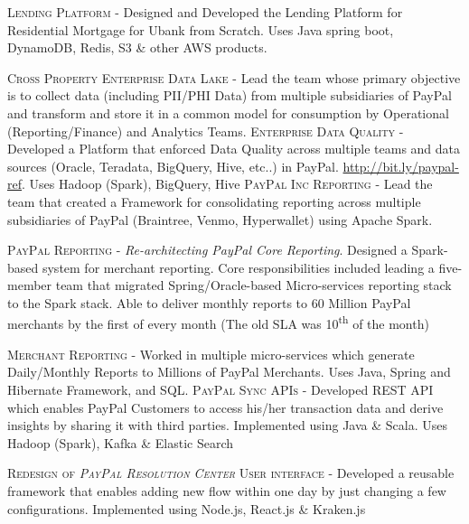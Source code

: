 \documentclass[11pt, a4paper, sans]{moderncv}
\begin{document}
{\textsc{Lending Platform} - Designed and Developed the Lending Platform for Residential Mortgage for Ubank from Scratch. Uses Java spring boot, DynamoDB, Redis, S3 \& other AWS products. \newline} 

{\textsc{Cross Property Enterprise Data Lake} - Lead the team whose primary objective is to collect data (including PII/PHI Data) from multiple subsidiaries of PayPal and transform and store it in a common model for consumption by Operational (Reporting/Finance) and Analytics Teams. \newline
\textsc{Enterprise Data Quality} - Developed a Platform that enforced Data Quality across multiple teams and data sources (Oracle, Teradata, BigQuery, Hive, etc..) in PayPal. \url{http://bit.ly/paypal-ref}. Uses Hadoop (Spark), BigQuery, Hive \newline
\textsc{PayPal Inc Reporting} - Lead the team that created a Framework for consolidating reporting across multiple subsidiaries of PayPal (Braintree, Venmo, Hyperwallet) using Apache Spark. \newline} 

{\textsc{PayPal Reporting} - \textit{Re-architecting PayPal Core Reporting}.  Designed a Spark-based system for merchant reporting. Core responsibilities included leading a five-member team that migrated Spring/Oracle-based Micro-services reporting stack to the Spark stack. 
Able to deliver monthly reports to 60 Million PayPal merchants by the first of every month (The old SLA was 10\textsuperscript{th} of the month)  \newline} 

{\textsc{Merchant Reporting} - Worked in multiple micro-services which generate Daily/Monthly Reports to Millions of PayPal Merchants. Uses Java, Spring and Hibernate Framework, and SQL. \newline 
\textsc{PayPal Sync APIs} - Developed REST API which enables PayPal Customers to access his/her transaction data and derive insights by sharing it with third parties. Implemented using Java \& Scala. Uses Hadoop (Spark), Kafka \& Elastic Search \newline} 

{\textsc{Redesign of \textit{PayPal Resolution Center} User interface} - Developed a reusable framework that enables adding new flow within one day by just changing a few configurations. Implemented using Node.js, React.js \& Kraken.js \newline} 
\end{document}
